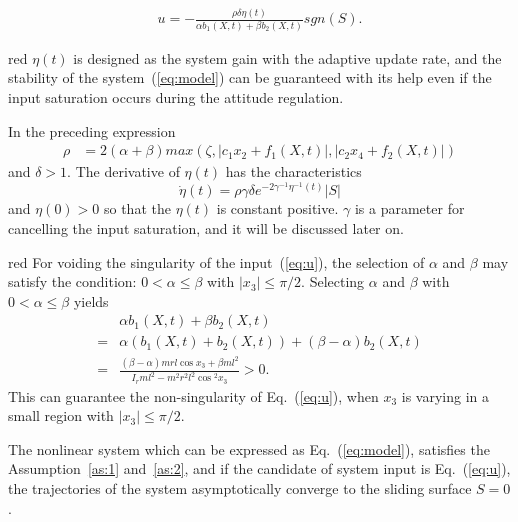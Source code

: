 \begin{align}
u = -\frac{\rho\delta\eta(t)}{\alpha b_1(X,t)+\beta b_2(X,t)}sgn(S)\label{eq:u}.
\end{align}\par
\begin{color}{red}
$\eta(t)$ is designed as the system gain with the adaptive update rate, and the stability of the system~(\ref{eq:model}) can be guaranteed with its help even if the input saturation occurs during the attitude regulation.
\end{color}
In the preceding expression
\begin{align}
\rho &= 2(\alpha+\beta)max(\zeta,\vert c_1x_2+f_1(X,t)\vert,\vert c_2x_4+f_2(X,t)\vert)
\end{align}
and $\delta>1$. The derivative of $\eta(t)$ has the characteristics $$\dot{{\eta}}(t) = \rho\gamma\delta e^{-2\gamma^{-1}{\eta}^{-1}(t)}\vert S\vert$$ and $\eta(0) > 0$ so that the $\eta(t)$ is constant positive. $\gamma$ is a parameter for cancelling the input saturation, and it will be discussed later on. \begin{color}{red}
For voiding the singularity of the input~(\ref{eq:u}), the selection of $\alpha$ and $\beta$ may satisfy the condition: $0<\alpha\le\beta$ with $\vert x_3\vert\le\pi/2$.
    Selecting $\alpha$ and $\beta$ with $0<\alpha\le\beta$ yields
    \begin{align*}
    &\alpha b_1(X,t)+\beta b_2(X,t)\\
    =& \alpha(b_1(X,t)+b_2(X,t))+(\beta-\alpha)b_2(X,t)\\
    =&\frac{(\beta-\alpha)mrl\cos x_3 + \beta ml^2}{I_rml^2-m^2r^2l^2\cos{^2x_3}}>0.
    \end{align*}
    This can guarantee the non-singularity of Eq.~(\ref{eq:u}), when $x_3$ is varying in a small region with $\vert x_3\vert\le\pi/2$.
\end{color}
\begin{theorem}
The nonlinear system which can be expressed as Eq.~(\ref{eq:model}), satisfies the Assumption~\ref{as:1} and~\ref{as:2}, and if the candidate of system input is Eq.~(\ref{eq:u}), the trajectories of the system asymptotically converge to the sliding surface $S = 0$.
\end{theorem}
